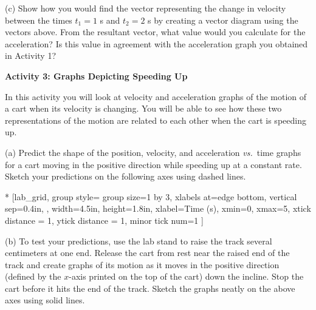(c) Show how you would find the vector representing the change in velocity
between the times $t_1 = 1$ s and $t_2 = 2$ s by creating a vector diagram using the 
vectors above. From the resultant vector, what value would you calculate for 
the acceleration? Is this value in agreement with the acceleration graph you obtained in Activity 1?
\answerspace{20mm}

\pagebreak[2]
\textbf{Activity 3: Graphs Depicting Speeding Up} 

In this activity you will look at velocity and acceleration graphs of the
motion of a cart when its velocity is changing. You will be able to see how
these two representations of the motion are related to each other when the cart
is speeding up.

(a) Predict the shape of the position, velocity, and acceleration \textit{vs.}~time graphs
for a cart moving in the positive direction while speeding up at a constant rate. Sketch your predictions on the following axes using dashed lines.



\begin{lab_groupplot}*{}
					[lab_grid,
	group style={
		group size=1 by 3,
		xlabels at=edge bottom,
		vertical sep=0.4in,
		},
	width=4.5in,  height=1.8in,
	xlabel=Time (s),
	xmin=0, xmax=5,
	xtick distance = 1, 
	ytick distance = 1, 
	minor tick num=1
	]
\nextgroupplot[
	ymin=0,ymax=2, 
	ylabel={Position (m)},
	ylabel_align={-1},
	]
\nextgroupplot[
	ymin=-1,ymax=1, 
	ylabel={Velocity (m/s)},
	]
\nextgroupplot[
	ymin=-1,ymax=1, 
	ylabel={Acceleration (m/s$^2$)},
	]
\end{lab_groupplot}

(b) To test your predictions, use the lab stand to raise the track several centimeters at one end. Release the cart from rest near the raised end of the track and create graphs of its motion as it moves in the positive direction (defined by the $x$-axis printed on the top of the cart) down the incline. Stop the cart before it hits the end of the track. Sketch the graphs neatly on the above axes using solid lines.

